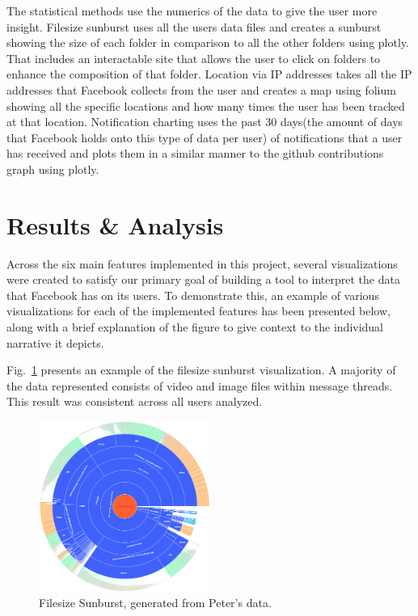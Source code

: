 \documentclass[conference, letterpaper, 11pt]{IEEEtran}
\begin{document}
The statistical methods use the numerics of the data to give the user more insight. Filesize sunburst uses all the users data files and creates a sunburst showing the size of each folder in comparison to all the other folders using plotly. That includes an interactable site that allows the user to click on folders to enhance the composition of that folder. Location via IP addresses takes all the IP addresses that Facebook collects from the user and creates a map using folium showing all the specific locations and how many times the user has been tracked at that location. Notification charting uses the past 30 days(the amount of days that Facebook holds onto this type of data per user) of notifications that a user has received and plots them in a similar manner to the github contributions graph using plotly.

\section{Results \& Analysis} \label{RA}
Across the six main features implemented in this project, several visualizations were created to satisfy our primary goal of building a tool to interpret the data that Facebook has on its users. To demonstrate this, an example of various visualizations for each of the implemented features has been presented below, along with a brief explanation of the figure to give context to the individual narrative it depicts.

Fig.~\ref{fig:fsb} presents an example of the filesize sunburst visualization. A majority of the data represented consists of video and image files within message threads. This result was consistent across all users analyzed.

\begin{figure}[htbp]
    \centering
    \includegraphics[width=0.5\textwidth]{img/fsb.png}
    \caption{Filesize Sunburst, generated from Peter's data.}
    \label{fig:fsb}
\end{figure}
\end{document}
